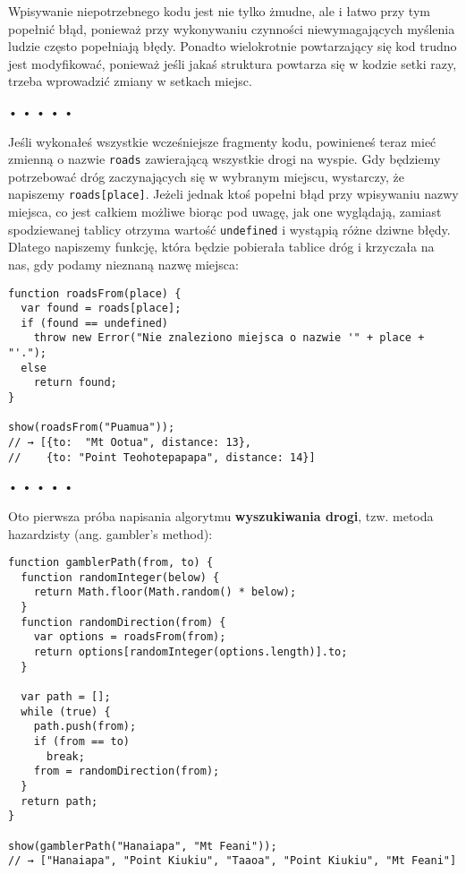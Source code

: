   
Wpisywanie niepotrzebnego kodu jest nie tylko żmudne, ale i łatwo przy tym popełnić błąd, ponieważ przy wykonywaniu czynności niewymagających myślenia ludzie często popełniają błędy. Ponadto wielokrotnie powtarzający się kod trudno jest modyfikować, ponieważ jeśli jakaś struktura powtarza się w kodzie setki razy, trzeba wprowadzić zmiany w setkach miejsc. 



\begin{center}
• • • • •
\end{center}

  
Jeśli wykonałeś wszystkie wcześniejsze fragmenty kodu, powinieneś teraz mieć zmienną o nazwie \texttt{roads} zawierającą wszystkie drogi na wyspie. Gdy będziemy potrzebować dróg zaczynających się w wybranym miejscu, wystarczy, że napiszemy \texttt{roads[place]}. Jeżeli jednak ktoś popełni błąd przy wpisywaniu nazwy miejsca, co jest całkiem możliwe biorąc pod uwagę, jak one wyglądają, zamiast spodziewanej tablicy otrzyma wartość \texttt{undefined} i wystąpią różne dziwne błędy. Dlatego napiszemy funkcję, która będzie pobierała tablice dróg i krzyczała na nas, gdy podamy nieznaną nazwę miejsca:

  
\begin{verbatim} 
function roadsFrom(place) {
  var found = roads[place];
  if (found == undefined)
    throw new Error("Nie znaleziono miejsca o nazwie '" + place + "'.");
  else
    return found;
}

show(roadsFrom("Puamua"));
// → [{to:	"Mt Ootua", distance: 13}, 
//    {to: "Point Teohotepapapa", distance: 14}]
\end{verbatim}


\begin{center}
• • • • •
\end{center}

  
Oto pierwsza próba napisania algorytmu \textbf{wyszukiwania drogi}, tzw. metoda hazardzisty (ang. gambler’s method):

  
\begin{verbatim} 
function gamblerPath(from, to) {
  function randomInteger(below) {
    return Math.floor(Math.random() * below);
  }
  function randomDirection(from) {
    var options = roadsFrom(from);
    return options[randomInteger(options.length)].to;
  }

  var path = [];
  while (true) {
    path.push(from);
    if (from == to)
      break;
    from = randomDirection(from);
  }
  return path;
}

show(gamblerPath("Hanaiapa", "Mt Feani"));
// → ["Hanaiapa", "Point Kiukiu", "Taaoa", "Point Kiukiu", "Mt Feani"]
\end{verbatim}
  
